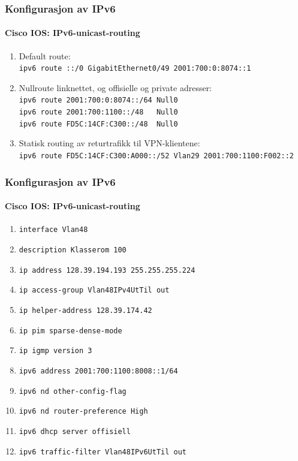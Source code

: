\begin{frame}%
  \frametitle{Konfigurasjon av IPv6}
  \framesubtitle{Cisco IOS: IPv6-unicast-routing}
  \begin{enumerate}[<+->]
  \item Default route:\\
    \alert{\texttt{ipv6 route ::/0 GigabitEthernet0/49 2001:700:0:8074::1}}
  \item Nullroute linknettet, og offisielle og private adresser:\\
    \alert{\texttt{ipv6 route 2001:700:0:8074::/64 Null0}}\\
    \alert{\texttt{ipv6 route 2001:700:1100::/48\ \ \ Null0}}\\
    \alert{\texttt{ipv6 route FD5C:14CF:C300::/48\ \  Null0}}
  \item Statisk routing av returtrafikk til VPN-klientene:\\
    \alert{\texttt{ipv6 route FD5C:14CF:C300:A000::/52 Vlan29 2001:700:1100:F002::2}}
  \end{enumerate}
\end{frame}

\begin{frame}%
  \frametitle{Konfigurasjon av IPv6}
  \framesubtitle{Cisco IOS: IPv6-unicast-routing}
  \begin{enumerate}[<+->]
  \item \alert{\texttt{interface Vlan48}}
  \item \texttt{description Klasserom 100}
  \item \texttt{ip address 128.39.194.193 255.255.255.224}
  \item \texttt{ip access-group Vlan48IPv4UtTil out}
  \item \texttt{ip helper-address 128.39.174.42}
  \item \texttt{ip pim sparse-dense-mode}
  \item \texttt{ip igmp version 3}
  \item \alert{\texttt{ipv6 address 2001:700:1100:8008::1/64}}
  \item \alert{\texttt{ipv6 nd other-config-flag}}
  \item \alert{\texttt{ipv6 nd router-preference High}}
  \item \alert{\texttt{ipv6 dhcp server offisiell}}
  \item \alert{\texttt{ipv6 traffic-filter Vlan48IPv6UtTil out}}
  \end{enumerate}
\end{frame}

